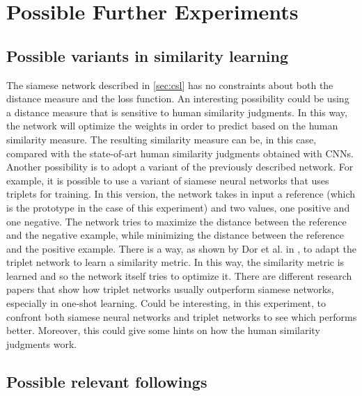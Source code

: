 \documentclass[conference]{IEEEtran}
\begin{document}
	\section{Possible Further Experiments}
	
		\subsection{Possible variants in similarity learning}
		
			\noindent The siamese network described in \ref{sec:csl} has no constraints about both the distance measure and the loss function. An interesting possibility could be using a distance measure that is sensitive 
			to human similarity judgments. In this way, the network will optimize the weights in order to predict based on the human similarity measure. The resulting similarity measure can be, in this case, 
			compared with the state-of-art human similarity judgments obtained with CNNs.\\
			Another possibility is to adopt a variant of the previously described network. For example, it is possible to use a variant of siamese neural networks that uses triplets for training. In this version, 
			the network takes in input a reference (which is the prototype in the case of this experiment) and two values, one positive and one negative. The network tries to maximize the distance between the reference and 
			the negative example, while minimizing the distance between the reference and the positive example. There is a way, as shown by Dor et al. in \cite{ein-dor-etal-2018-learning}, to adapt the triplet 
			network to learn a similarity metric. In this way, the similarity metric is learned and so the network itself tries to optimize it. There are different research papers that show how triplet networks 
			usually outperform siamese networks, especially in one-shot learning. Could be interesting, in this experiment, to confront both siamese neural networks and triplet networks to see which performs better. 
			Moreover, this could give some hints on how the human similarity judgments work.
		
		\subsection{Possible relevant followings}
	
\end{document}
